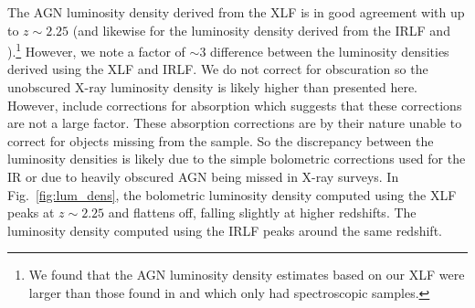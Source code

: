 \documentclass[twocolumn, trackchanges]{aastex63}
\newcommand{\jr}[1]{{\color{purple}[JR: #1]}}
\begin{document}


The AGN luminosity density derived from the XLF is in good agreement with \cite{ranalli_210_2016} up to $z\sim 2.25$ (and likewise for the luminosity density derived from the IRLF and \cite{lacy_spitzer_2015}).\footnote{We found that the AGN luminosity density estimates based on our XLF were larger than those found in \cite{aird_evolution_2010} and \cite{yencho_optx_2009} which only had spectroscopic samples.}
However, we note a factor of $\sim3$ difference between the luminosity densities derived using the XLF and IRLF. 
We do not correct for obscuration so the unobscured X-ray luminosity density is likely higher than presented here.
However, \cite{ranalli_210_2016} include corrections for absorption which suggests that these corrections are not a large factor.
These absorption corrections are by their nature unable to correct for objects missing from the sample.
So the discrepancy between the luminosity densities is likely due to the simple bolometric corrections used for the IR or due to heavily obscured AGN being missed in X-ray surveys.
In Fig.~\ref{fig:lum_dens}, the bolometric luminosity density computed using the XLF peaks at $z\sim 2.25$ and flattens off, falling slightly at higher redshifts. 
The luminosity density computed using the IRLF peaks around the same redshift.
\end{document}

